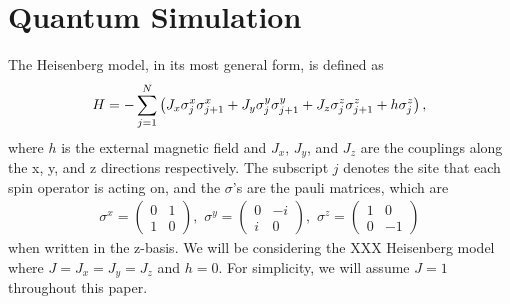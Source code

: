 \documentclass[aps,prl, reprint]{revtex4-2}
\begin{document}
\section{Quantum Simulation}

The Heisenberg model, in its most general form, is defined as
\begin{dmath}
H =- \sum_{j=1}^{N}\left(J_{x} \sigma_{j}^{x} \sigma_{j+1}^{x}+J_{y} \sigma_{j}^{y} \sigma_{j+1}^{y}\\
+J_{z} \sigma_{j}^{z} \sigma_{j+1}^{z}+h \sigma_{j}^{z}\right),
\end{dmath}
where $h$ is the external magnetic field and $J_x$, $J_y$, and $J_z$ are the couplings along the x, y, and z directions respectively. The subscript $j$ denotes the site that each spin operator is acting on, and the $\sigma$'s are the pauli matrices, which are
\begin{equation}
\begin{array}{c}
\sigma^{x}=\left(\begin{array}{cc}
0 & 1 \\
1 & 0
\end{array}\right), \,\,
\sigma^{y}=\left(\begin{array}{cc}
0 & -i \\
i & 0
\end{array}\right),\,\,
\sigma^{z}=\left(\begin{array}{cc}
1 & 0 \\
0 & -1
\end{array}\right)
\end{array}
\end{equation}
when written in the z-basis. We will be considering the XXX Heisenberg model where $J = J_x = J_y = J_z$ and $h =0$. For simplicity, we will assume $J=1$ throughout this paper.  
\end{document}
